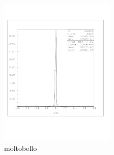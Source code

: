 \documentclass[a4paper]{article}
\begin{document}
\begin{figure}[!htb]
  \includegraphics[width=0.49\textwidth]{ex_images/1_020_140_xs.jpg}
  \caption{moltobello}
  \label{fig:020_xs}
\end{figure}
\end{document}
